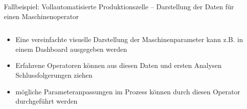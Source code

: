 \documentclass[aspectratio=1610, xcolor=dvipsnames, 9pt]{beamer}
\begin{document}
           \begin{frame}{Fallbeispiel: Vollautomatisierte Produktionszelle -- Darstellung der Daten für einen Maschinenoperator}
            \begin{columns}
              \begin{column}{0.6\textwidth}
                \begin{itemize}
                  \item Eine vereinfachte visuelle Darstellung der Maschinenparameter kann z.B. in einem Dashboard ausgegeben werden \newline
                  \item Erfahrene Operatoren können aus diesen Daten und ersten Analysen Schlussfolgerungen ziehen \newline
                  \item mögliche Parameteranpassungen im Prozess können durch diesen Operator durchgeführt werden
                \end{itemize}
              \end{column}
            \end{columns}
          \end{frame}
\end{document}
